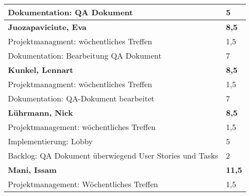 \documentclass[a4paper,11pt]{scrartcl}
\begin{document}
\begin{longtable}{| p{13.8cm} | C{2.4cm} |}
  Dokumentation: QA Dokument
	&
  5
	\\
  \hline
	\hline


	\textbf{Juozapaviciute, Eva} & \textbf{8,5}\\ %
	\hline

  Projektmanagment: wöchentliches Treffen
	&
  1,5
	\\
	\hline

  Dokumentation: Bearbeitung QA Dokument
	&
  7
	\\
	\hline
	\hline


	\textbf{Kunkel, Lennart} & \textbf{8,5}\\ %
	\hline

  Projektmanagment: wöchentliches Treffen
	&
  1,5
	\\
	\hline

  Dokumentation: QA-Dokument bearbeitet
	&
  7
	\\
	\hline
	\hline


	\textbf{Lührmann, Nick} & \textbf{8,5}\\ %
	\hline

	Projektmanagement: wöchentliches Treffen
	&
	1,5
	\\
	\hline

	Implementierung: Lobby
	&
  5
	\\
	\hline

  Backlog: QA Dokument überwiegend User Stories und Tasks
	&
  2
	\\
	\hline
	\hline


	\textbf{Mani, Issam} & \textbf{11,5}\\ %
	\hline

  Projektmanagement: Wöchentliches Treffen
	&
  1,5
	\\
	\hline
	

\end{longtable}
\end{document}
